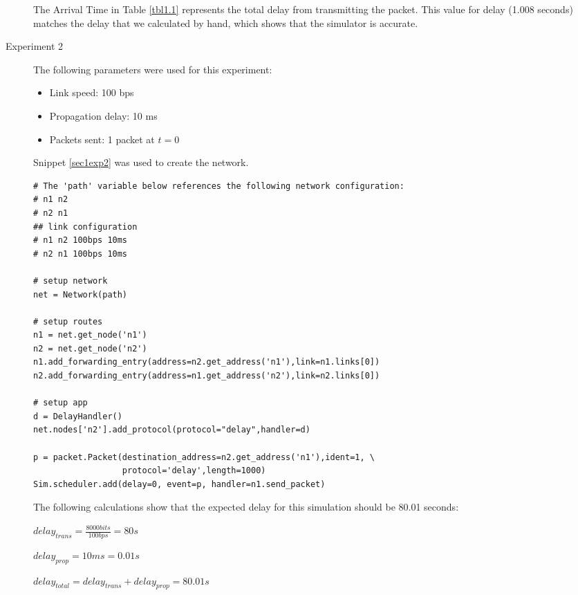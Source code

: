 \documentclass[11pt]{article}
\begin{document}
\begin{description}
\smallskip

The Arrival Time in Table \ref{tbl1.1} represents the total delay from transmitting the packet. This value for delay (1.008 seconds) matches the delay that we calculated by hand, which shows that the simulator is accurate.

\item[Experiment 2] \hfill \break
The following parameters were used for this experiment:

\begin{itemize}
\item Link speed: 100 bps
\item Propagation delay: 10 ms
\item Packets sent: 1 packet at $t = 0$
\end{itemize}

\medskip

Snippet \ref{sec1exp2} was used to create the network.

\medskip

\begin{lstlisting}[caption={Network 1.2},label=sec1exp2]
# The 'path' variable below references the following network configuration:
# n1 n2
# n2 n1
## link configuration
# n1 n2 100bps 10ms
# n2 n1 100bps 10ms

# setup network
net = Network(path)

# setup routes
n1 = net.get_node('n1')
n2 = net.get_node('n2')
n1.add_forwarding_entry(address=n2.get_address('n1'),link=n1.links[0])
n2.add_forwarding_entry(address=n1.get_address('n2'),link=n2.links[0])

# setup app
d = DelayHandler()
net.nodes['n2'].add_protocol(protocol="delay",handler=d)

p = packet.Packet(destination_address=n2.get_address('n1'),ident=1, \
                  protocol='delay',length=1000)
Sim.scheduler.add(delay=0, event=p, handler=n1.send_packet)
\end{lstlisting}

The following calculations show that the expected delay for this simulation should be 80.01 seconds:
\begin{addmargin}[1em]{0em}
$delay_{trans} = \frac{8000 bits}{100 bps} = 80s $

$delay_{prop} = 10ms = 0.01s$

$delay_{total} = delay_{trans} + delay_{prop} = 80.01s $
\end{addmargin}

\bigskip


\end{description}
\end{document}

